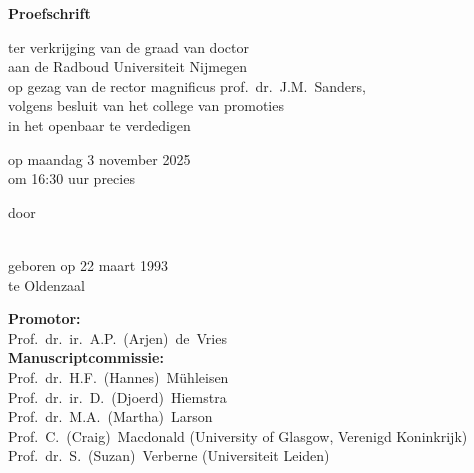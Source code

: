 \newpage

\begin{titlepage}
	\begin{center}
		\vspace*{3.5cm}
		
		\huge{\bfseries\mytitle}
		
		\vspace*{15pt}
		
		\normalsize
		
		\vspace{2.0cm}
		
		\textbf{Proefschrift}
		
		\vspace{0.5cm}
		
		ter verkrijging van de graad van doctor\\
		aan de Radboud Universiteit Nijmegen\\
		op gezag van de rector magnificus
		prof.~dr.~J.M.\ Sanders,\\
		volgens besluit van het college van promoties\\
		in het openbaar te verdedigen
		
		\vspace{0.5cm}
		
		op maandag 3 november 2025\\
		\vspace{0.2cm}
		om 16:30 uur precies
		
		\vspace{0.5cm}
		
		door
		
		\vspace{0.5cm}
		
		\textbf{\myauthor}\\
		
		geboren op 22 maart 1993\\
		te Oldenzaal
	\end{center}
\end{titlepage}

\newpage%

\thispagestyle{empty}

\small{

\noindent\textbf{Promotor:}\\
Prof.\ dr.\ ir.\ A.P.\ (Arjen)\ de\ Vries\\
\newline
\noindent\textbf{Manuscriptcommissie:}\\
Prof.\ dr.\ H.F.\ (Hannes)\ Mühleisen\\
Prof.\ dr.\ ir.\ D.\ (Djoerd)\ Hiemstra\\
Prof.\ dr.\ M.A.\ (Martha)\ Larson\\
Prof.\ C.\ (Craig)\ Macdonald \hfill (University of Glasgow, Verenigd Koninkrijk)\\
Prof.\ dr.\ S.\ (Suzan)\ Verberne \hfill (Universiteit Leiden) \\

}
